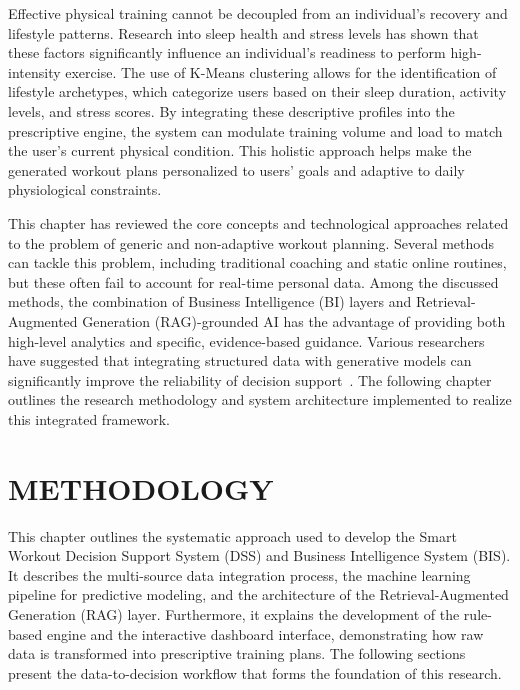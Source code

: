 \documentclass{aitthesis}
\begin{document}
Effective physical training cannot be decoupled from an individual's recovery and lifestyle patterns. Research into sleep health and stress levels has shown that these factors significantly influence an individual's readiness to perform high-intensity exercise. The use of K-Means clustering allows for the identification of lifestyle archetypes, which categorize users based on their sleep duration, activity levels, and stress scores. By integrating these descriptive profiles into the prescriptive engine, the system can modulate training volume and load to match the user's current physical condition. This holistic approach helps make the generated workout plans personalized to users' goals and adaptive to daily physiological constraints.

This chapter has reviewed the core concepts and technological approaches related to the problem of generic and non-adaptive workout planning. Several methods can tackle this problem, including traditional coaching and static online routines, but these often fail to account for real-time personal data. Among the discussed methods, the combination of Business Intelligence (BI) layers and Retrieval-Augmented Generation (RAG)-grounded AI has the advantage of providing both high-level analytics and specific, evidence-based guidance. Various researchers have suggested that integrating structured data with generative models can significantly improve the reliability of decision support~\cite{power2002,lewis2020}. The following chapter outlines the research methodology and system architecture implemented to realize this integrated framework.

\chapter{METHODOLOGY}

This chapter outlines the systematic approach used to develop the Smart Workout Decision Support System (DSS) and Business Intelligence System (BIS). It describes the multi-source data integration process, the machine learning pipeline for predictive modeling, and the architecture of the Retrieval-Augmented Generation (RAG) layer. Furthermore, it explains the development of the rule-based engine and the interactive dashboard interface, demonstrating how raw data is transformed into prescriptive training plans. The following sections present the data-to-decision workflow that forms the foundation of this research.
\end{document}
